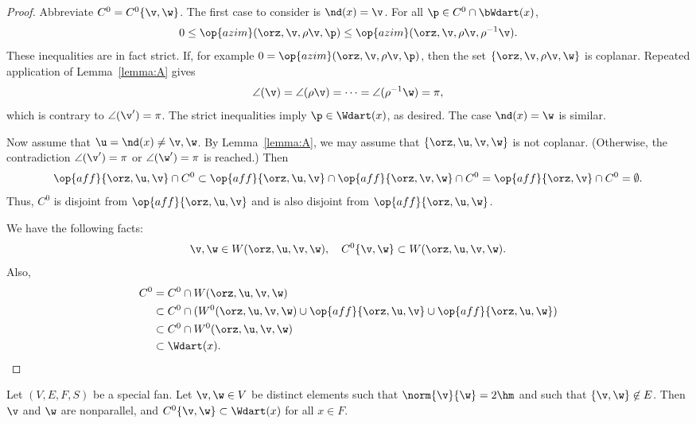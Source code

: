 \begin{proof} Abbreviate $C^0 = C^0\{\v,\w\}$.  The first case to
consider is $\nd(x)=\v$.  For all $\p\in C^0\cap \bWdart(x)$,
\[ 
  0 \le \op{azim}(\orz,\v,\rho \v,\p) 
\le \op{azim}(\orz,\v,\rho \v,\rho^{-1} \v).
\]   
These inequalities are in fact strict.  If, for example $0 =
\op{azim}(\orz,\v,\rho \v,\p)$, then the set $\{\orz,\v,\rho \v,\w\}$
is coplanar.  Repeated application of Lemma~\ref{lemma:A} gives
\[ 
\angle(\v) = \angle(\rho \v) = \cdots = \angle(\rho^{-1} \w) = \pi,
\] 
which is contrary to $\angle(\v') = \pi$.  The strict inequalities
imply $\p\in \Wdart(x)$, as desired.  The case $\nd(x)=\w$ is similar.

Now assume that $\u=\nd(x)\ne \v,\w$.  By Lemma~\ref{lemma:A}, we may
assume that $\{\orz,\u,\v,\w\}$ is not coplanar.  (Otherwise, the
contradiction $\angle(\v')=\pi$ or $\angle(\w')=\pi$ is reached.) Then
\[ 
  \op{aff}\{\orz,\u,\v\}\cap C^0 \subset \op{aff}\{\orz,\u,\v\}
  \cap \op{aff}\{\orz,\v,\w\} \cap C^0 
= \op{aff}\{\orz,\v\} \cap C^0 = \emptyset.
\] 
Thus, $C^0$ is disjoint from $\op{aff}\{\orz,\u,\v\}$ and is also
disjoint from $\op{aff}\{\orz,\u,\w\}$.

We have the following facts:
\[ 
\v,\w\in W(\orz,\u,\v,\w),\quad C^0\{\v,\w\} \subset W(\orz,\u,\v,\w).
\] 
Also,
\begin{align*}
  C^0 &= C^0\cap W(\orz,\u,\v,\w) \\
  &\subset C^0 \cap (W^0(\orz,\u,\v,\w) 
\cup \op{aff}\{\orz,\u,\v\} \cup \op{aff}\{\orz,\u,\w\})\\
  &\subset C^0 \cap W^0(\orz,\u,\v,\w)\\
  &\subset \Wdart(x).
\end{align*}
\end{proof}

\begin{lemma}[]\label{lemma:2hm-slice}
Let $(V,E,F,S)$ be a special fan.  Let $\v,\w\in V$ be distinct
elements such that $\norm{\v}{\w}=2\hm$ and such that
$\{\v,\w\}\not\in E$.  Then $\v$ and $\w$ are nonparallel, and
$C^0\{\v,\w\}\subset \Wdart(x)$ for all $x\in F$.
\end{lemma}

